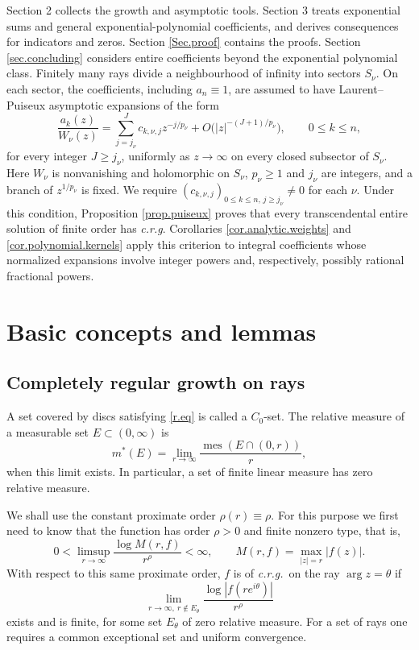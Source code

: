 \documentclass[a4paper,12pt]{article}
\numberwithin{equation}{section}
\begin{document}
\bigskip
Section 2 collects the growth and asymptotic tools. Section 3 treats exponential sums and general exponential-polynomial coefficients, and derives consequences for indicators and zeros. Section \ref{Sec.proof} contains the
proofs. Section \ref{sec.concluding} considers entire coefficients beyond the
exponential polynomial class. Finitely many rays divide a neighbourhood
of infinity into sectors $S_\nu$. On each sector, the coefficients,
including $a_n\equiv1$, are assumed to have Laurent--Puiseux asymptotic
expansions of the form
\[
 \frac{a_k(z)}{W_\nu(z)}
 =\sum_{j=j_\nu}^{J}c_{k,\nu,j}z^{-j/p_\nu}
   +O\bigl(|z|^{-(J+1)/p_\nu}\bigr),
 \qquad 0\le k\le n,
\]
for every integer $J\ge j_\nu$, uniformly as $z\to\infty$ on every
closed subsector of $S_\nu$.
Here $W_\nu$ is nonvanishing and holomorphic on $S_\nu$,
$p_\nu\ge1$ and $j_\nu$ are integers, and a branch of $z^{1/p_\nu}$
is fixed. We require
$(c_{k,\nu,j})_{0\le k\le n,\,j\ge j_\nu}\ne0$ for each $\nu$.
Under this condition, Proposition \ref{prop.puiseux} proves that every
transcendental entire solution of finite order has \textit{c.r.g}.
Corollaries \ref{cor.analytic.weights} and
\ref{cor.polynomial.kernels} apply this criterion to integral
coefficients whose normalized expansions involve integer powers
and, respectively, possibly rational fractional powers.

\section{Basic concepts and lemmas}
\subsection{Completely regular growth on rays}\label{Sec.crg}
A set covered by discs satisfying \eqref{r.eq} is called a $C_0$-set.
The relative measure of a measurable set $E\subset(0,\infty)$ is
\[
 m^*(E)=\lim_{r\to\infty}\frac{\operatorname{mes}(E\cap(0,r))}{r},
\]
when this limit exists. In particular, a set of finite linear measure has zero relative measure.

We shall use the constant proximate order $\rho(r)\equiv\rho$.
For this purpose we first need to know that the function has order $\rho>0$
and finite nonzero type, that is,
\[
 0<\limsup_{r\to\infty}\frac{\log M(r,f)}{r^\rho}<\infty,
 \qquad M(r,f)=\max_{|z|=r}|f(z)|.
\]
With respect to this same proximate order, $f$ is of \textit{c.r.g.}\
on the ray $\arg z=\theta$ if
\[
 \lim_{r\to\infty,\ r\notin E_\theta}
 \frac{\log|f(re^{i\theta})|}{r^\rho}
\]
exists and is finite, for some set $E_\theta$ of zero relative measure.
For a set of rays one requires a common exceptional set and uniform convergence.
\end{document}
